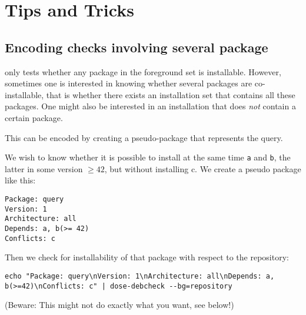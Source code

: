 
\section{Tips and Tricks}
\label{sec:tricks}
\subsection{Encoding checks involving several package}
\debcheck{} only tests whether any package in the foreground set is
installable. However, sometimes one is interested in knowing whether
several packages are co-installable, that is whether there exists an
installation set that contains all these packages. One might also be
interested in an installation that does \emph{not} contain a certain
package.

This can be encoded by creating a pseudo-package that
represents the query. 

\begin{example}
  We wish to know whether it is possible to install at the same time
  \texttt{a} and \texttt{b}, the latter in some version $\geq 42$, but
  without installing c. We create a pseudo package like this:
\begin{verbatim}
Package: query
Version: 1
Architecture: all
Depends: a, b(>= 42)
Conflicts: c
\end{verbatim}
Then we check for installability of that package with respect to the
repository:
\begin{verbatim}
echo "Package: query\nVersion: 1\nArchitecture: all\nDepends: a, b(>=42)\nConflicts: c" | dose-debcheck --bg=repository
\end{verbatim}
(Beware: This might not do exactly what you want, see below!)
\end{example}

